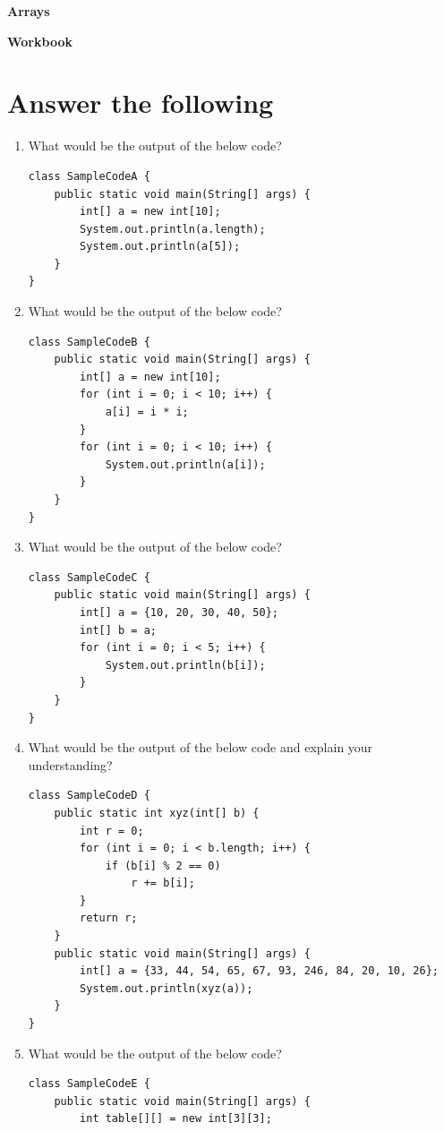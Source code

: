 \documentclass[11pt,a4paper]{article}
\def\AnswerBox{\fbox{\begin{minipage}{4in}\hfill\vspace{0.5in}  \end{minipage}}}
\begin{document}
\centerline{\huge{ \textbf{Arrays}}}
\vspace{1pc}
\centerline{\Large{ \textbf{Workbook}}}
\section*{Answer the following}
\begin{enumerate}
\item What would be the output of the below code?
\begin{lstlisting}
class SampleCodeA {
    public static void main(String[] args) {
        int[] a = new int[10];
        System.out.println(a.length);
        System.out.println(a[5]);
    }
}
\end{lstlisting}
\AnswerBox

\item What would be the output of the below code? 
\begin{lstlisting}
class SampleCodeB {
    public static void main(String[] args) {
        int[] a = new int[10];
        for (int i = 0; i < 10; i++) {
            a[i] = i * i;
        }
        for (int i = 0; i < 10; i++) {
            System.out.println(a[i]);
        }
    }
}
\end{lstlisting}
\AnswerBox
\item What would be the output of the below code?
\begin{lstlisting}
class SampleCodeC {
    public static void main(String[] args) {
        int[] a = {10, 20, 30, 40, 50};
        int[] b = a;
        for (int i = 0; i < 5; i++) {
            System.out.println(b[i]);
        }
    }
}
\end{lstlisting}
\AnswerBox
\item What would be the output of the below code and explain your understanding?
\begin{lstlisting}
class SampleCodeD {
    public static int xyz(int[] b) {
        int r = 0; 
        for (int i = 0; i < b.length; i++) {
            if (b[i] % 2 == 0)
                r += b[i];
        }
        return r;
    }
    public static void main(String[] args) {
        int[] a = {33, 44, 54, 65, 67, 93, 246, 84, 20, 10, 26};
        System.out.println(xyz(a));
    }
}
\end{lstlisting}
\AnswerBox
\item What would be the output of the below code?
\begin{lstlisting}
class SampleCodeE {
    public static void main(String[] args) {
        int table[][] = new int[3][3];

\end{lstlisting}
\end{enumerate}
\end{document}
